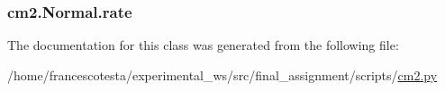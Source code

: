 \subsubsection[{\texorpdfstring{rate}{rate}}]{\setlength{\rightskip}{0pt plus 5cm}cm2.\+Normal.\+rate\hspace{0.3cm}{\ttfamily [static]}}\hypertarget{classcm2_1_1Normal_a9a5e8cb0a56188898c1641699018750f}{}\label{classcm2_1_1Normal_a9a5e8cb0a56188898c1641699018750f}


The documentation for this class was generated from the following file\+:\begin{DoxyCompactItemize}
\item 
/home/francescotesta/experimental\+\_\+ws/src/final\+\_\+assignment/scripts/\hyperlink{cm2_8py}{cm2.\+py}\end{DoxyCompactItemize}
